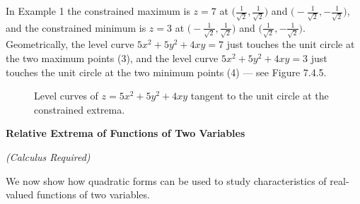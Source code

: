 \documentclass{article}
\newcommand{\redheading}[1]{{\vspace{2mm}\noindent\Large\bfseries\color{red!55!black} #1\par}\vspace{2mm}}
\begin{document}
In Example 1 the constrained maximum is $z=7$ at $\bigl(\tfrac{1}{\sqrt2},\tfrac{1}{\sqrt2}\bigr)$
and $\bigl(-\tfrac{1}{\sqrt2},-\tfrac{1}{\sqrt2}\bigr)$, and the constrained minimum is $z=3$
at $\bigl(-\tfrac{1}{\sqrt2},\tfrac{1}{\sqrt2}\bigr)$ and $\bigl(\tfrac{1}{\sqrt2},-\tfrac{1}{\sqrt2}\bigr)$.
Geometrically, the level curve $5x^2+5y^2+4xy=7$ just touches the unit circle at the two
maximum points (3), and the level curve $5x^2+5y^2+4xy=3$ just touches the unit circle at
the two minimum points (4) --- see Figure 7.4.5.

\begin{figure}[ht]
\centering
{}
\caption{Level curves of $z=5x^2+5y^2+4xy$ tangent to the unit circle at the constrained
extrema.}
\label{fig:745}
\end{figure}

\redheading{Relative Extrema of Functions of Two Variables}
\textit{(Calculus Required)}

We now show how quadratic forms can be used to study characteristics of real-valued
functions of two variables.
\end{document}
